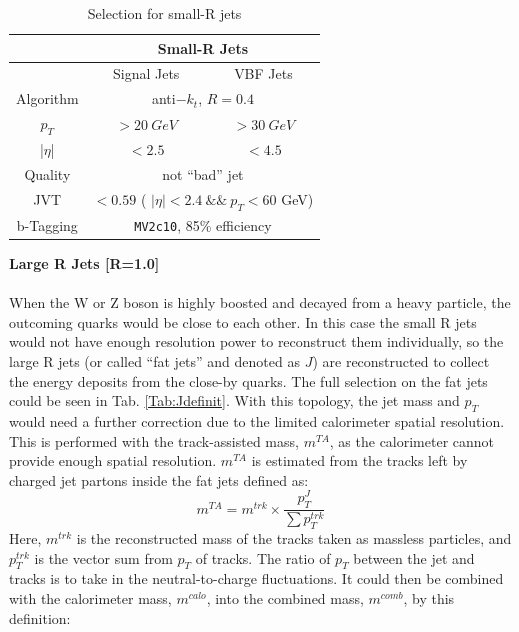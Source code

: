\begin{table}[tbh]
	\caption{Selection for small-R jets}\label{tab:sjdefinit}
	\vspace{2.0em}
	\centering
	\begin{tabular}{|c||c|c|}
		\hline
		             & \multicolumn{2}{|c|}{ Small-R Jets }\\
		\hline
		             & Signal Jets & VBF Jets \\
		\hline
		Algorithm    & \multicolumn{2}{|c|}{ anti$-k_t$, $R=0.4$}\\
		\hline
		$p_T$        & $>20~GeV$ & $>30~GeV$\\
		\hline
		|$\eta$|     & $< 2.5$ & $<4.5$  \\
		\hline
		Quality      & \multicolumn{2}{|c|}{not ``bad'' jet}\\
		\hline
		JVT          & \multicolumn{2}{|c|}{$< 0.59$ ( $| \eta | < 2.4 ~ \& \& ~p_T < 60 $ GeV)} \\
		\hline
		b-Tagging    & \multicolumn{2}{|c|}{\texttt{MV2c10}, 85\% efficiency} \\
		\hline
	\end{tabular}
\end{table}
\noindent
{\bf Large R Jets [R=1.0]}
\\
\\When the W or Z boson is highly boosted and decayed from a heavy particle, the outcoming quarks would be close to each other. In this case the small R jets would not have enough resolution power to reconstruct them individually, so the large R jets (or called ``fat jets'' and denoted as $J$) are reconstructed to collect the energy deposits from the close-by quarks. The full selection on the fat jets could be seen in Tab. \ref{Tab:Jdefinit}. With this topology, the jet mass and $p_{T}$ would need a further correction due to the limited calorimeter spatial resolution. This is performed with the track-assisted mass, $m^{TA}$\cite{ATLAS-CONF-2016-035}, as the calorimeter cannot provide enough spatial resolution. $m^{TA}$ is estimated from the tracks left by charged jet partons inside the fat jets defined as:
\begin{equation}
m^{TA} = m^{trk} \times \frac{p_{T}^{J}}{\sum p_{T}^{trk}}
\end{equation}  
Here, $m^{trk}$ is the reconstructed mass of the tracks taken as massless particles, and $p_{T}^{trk}$ is the vector sum from $p_{T}$ of tracks.  The ratio of $p_{T}$ between the jet and tracks is to take in the neutral-to-charge fluctuations. It could then be combined with the calorimeter mass, $m^{calo}$, into the combined mass, $m^{comb}$, by this definition:
